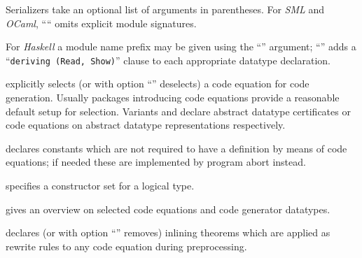 \begin{isabellebody}
\begin{isamarkuptext}
\begin{description}
  Serializers take an optional list of arguments in parentheses.  For
  \emph{SML} and \emph{OCaml}, ```` omits
  explicit module signatures.

  For \emph{Haskell} a module name prefix may be given using the
  ``'' argument; ``'' adds a
  ``\verb|deriving (Read, Show)|'' clause to each appropriate
  datatype declaration.

  \item \hyperlink{attribute.HOL.code}{\mbox{}} explicitly selects (or with option
  ``'' deselects) a code equation for code generation.
  Usually packages introducing code equations provide a reasonable
  default setup for selection.  Variants  and
   declare abstract datatype certificates or
  code equations on abstract datatype representations respectively.

  \item \hyperlink{command.HOL.code-abort}{\mbox{}} declares constants which are not
  required to have a definition by means of code equations; if needed
  these are implemented by program abort instead.

  \item \hyperlink{command.HOL.code-datatype}{\mbox{}} specifies a constructor set
  for a logical type.

  \item \hyperlink{command.HOL.print-codesetup}{\mbox{}} gives an overview on
  selected code equations and code generator datatypes.

  \item \hyperlink{attribute.HOL.code-inline}{\mbox{}} declares (or with option
  ``'' removes) inlining theorems which are applied as
  rewrite rules to any code equation during preprocessing.


\end{description}
\end{isamarkuptext}
\end{isabellebody}
